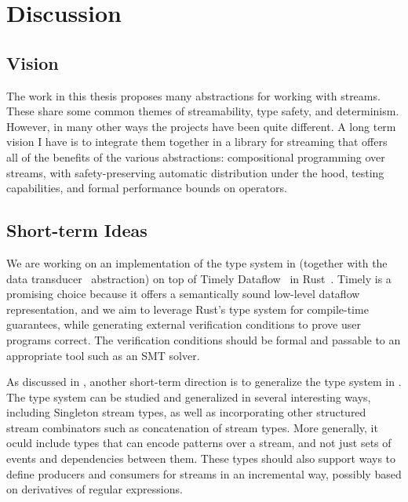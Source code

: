 \chapter{Discussion}
\label{cha:discussion}

\section{Vision}

The work in this thesis proposes many abstractions for working with streams. These share some common themes of streamability, type safety, and determinism.
However, in many other ways the projects have been quite different.
A long term vision I have is to integrate them together in a library for streaming that offers all of the benefits of the various abstractions:
compositional programming over streams, with safety-preserving automatic distribution under the hood, testing capabilities, and formal performance bounds on operators.

\section{Short-term Ideas}

We are working on an implementation of the type system in  (together with the data transducer~ abstraction) on top of Timely Dataflow~\cite{Timely,Naiad2013} in Rust~\cite{RustLang}.
Timely is a promising choice because it offers a semantically sound low-level dataflow representation,
and we aim to leverage Rust's type system for compile-time guarantees,
while generating external verification conditions to prove user programs correct.
The verification conditions should be formal and passable to an appropriate tool such as an SMT solver.

As discussed in , another short-term direction is to generalize the type system in .
The type system can be studied and generalized in several interesting ways, including Singleton stream types, as well as incorporating other structured stream combinators such as concatenation of stream types.
More generally, it oculd include types that can encode patterns over a stream, and not just sets of events and dependencies between them.
These types should also support ways to define producers and consumers for streams in an incremental way, possibly based on derivatives of regular expressions.


